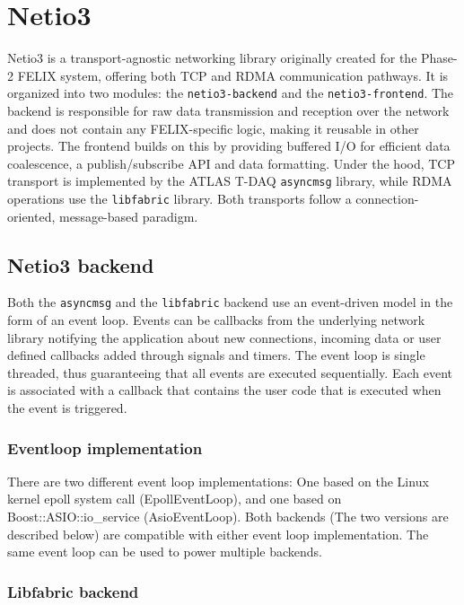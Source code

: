 \chapter{Netio3}
\label{chap:netio3}

Netio3 \cite{netio3-docs} is a transport-agnostic networking library originally created for the Phase-2 \acs{FELIX} system, offering both TCP and \acs{RDMA} communication pathways.  It is organized into two modules: the \texttt{netio3-backend} and the \texttt{netio3-frontend}.  The backend is responsible for raw data transmission and reception over the network and does not contain any \acs{FELIX}-specific logic, making it reusable in other projects. The frontend builds on this by providing buffered I/O for efficient data coalescence, a publish/subscribe API and data formatting.  Under the hood, TCP transport is implemented by the \acs{ATLAS} \acs{T-DAQ} \texttt{asyncmsg} \cite{asyncmsg} library, while \acs{RDMA} operations use the \texttt{libfabric} \cite{libfabric} library.  Both transports follow a connection-oriented, message-based paradigm.

\section{Netio3 backend}

Both the \texttt{asyncmsg} and the \texttt{libfabric} backend use an event-driven model in the form of an event loop. Events can be callbacks from the underlying network library notifying the application about new connections, incoming data or user defined callbacks added through signals and timers. The event loop is single threaded, thus guaranteeing that all events are executed sequentially. Each event is associated with a callback that contains the user code that is executed when the event is triggered.

\subsection{Eventloop implementation}

There are two different event loop implementations: One based on the Linux kernel epoll system call (EpollEventLoop), and one based on Boost::ASIO::io\_service (AsioEventLoop). Both backends (The two versions are described below) are compatible with either event loop implementation. The same event loop can be used to power multiple backends.


\subsection{Libfabric backend}
\label{subsec:libfabric}


